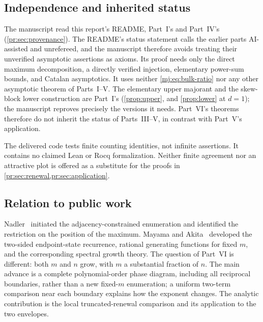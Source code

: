 \documentclass[11pt,a4paper]{article}
\theoremstyle{definition}\newaliascnt{definition}{theorem}
\theoremstyle{remark}\newaliascnt{remark}{theorem}
\begin{document}
\subsection{Independence and inherited status}
\label{pr:sec:inherited}
The manuscript read this report's README, Part~I's 
and Part~IV's 
(\cref{pr:sec:provenance}). The README's status statement calls the
earlier parts AI-assisted and unrefereed, and the manuscript therefore
avoids treating their unverified asymptotic assertions as axioms. Its proof
needs only the direct maximum decomposition, a directly verified injection,
elementary power-sum bounds, and Catalan asymptotics. It uses neither
\eqref{mj:eq:bulk-ratio} nor any other asymptotic theorem of Parts~I--V.
The elementary upper majorant and the skew-block lower construction are
Part~I's (\cref{prop:upper}, and \cref{prop:lower} at $d=1$); the manuscript
reproves precisely the versions it needs. Part~VI's theorems therefore do not
inherit the status of Parts~III--V, in contrast with Part~V's application.

The delivered code tests finite counting identities, not infinite
assertions. It contains no claimed Lean or Rocq formalization. Neither
finite agreement nor an attractive plot is offered as a substitute for the
proofs in \cref{pr:sec:renewal,pr:sec:application}.

\subsection{Relation to public work}
Nadler~\cite{Nadler} initiated the adjacency-constrained enumeration and
identified the restriction on the position of the maximum. Mayama and
Akita~\cite{MayamaAkita} developed the two-sided endpoint-state recurrence,
rational generating functions for fixed $m$, and the corresponding spectral
growth theory. The question of Part~VI is different: both $m$ and $n$ grow,
with $m$ a substantial fraction of $n$. The main advance is a complete
polynomial-order phase diagram, including all reciprocal boundaries, rather
than a new fixed-$m$ enumeration; a uniform two-term comparison near each
boundary explains how the exponent changes. The analytic contribution is the
local truncated-renewal comparison and its application to the two envelopes.
\end{document}
